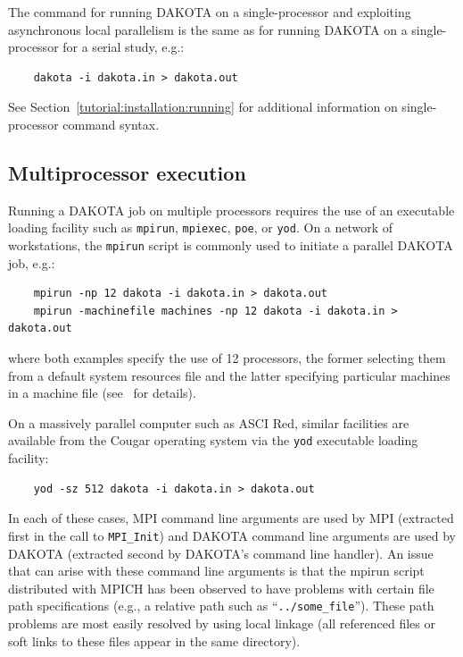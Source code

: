 The command for running DAKOTA on a single-processor and exploiting
asynchronous local parallelism is the same as for running DAKOTA on a
single-processor for a serial study, e.g.:
\begin{small}
\begin{verbatim}
    dakota -i dakota.in > dakota.out
\end{verbatim}
\end{small}

See Section~\ref{tutorial:installation:running} for additional
information on single-processor command syntax.

\subsection{Multiprocessor execution}\label{parallel:running:multiprocessor}

Running a DAKOTA job on multiple processors requires the use of an
executable loading facility such as \texttt{mpirun}, \texttt{mpiexec},
\texttt{poe}, or \texttt{yod}.  On a network of workstations, the
\texttt{mpirun} script is commonly used to initiate a parallel DAKOTA
job, e.g.:
\begin{small}
\begin{verbatim}
    mpirun -np 12 dakota -i dakota.in > dakota.out
    mpirun -machinefile machines -np 12 dakota -i dakota.in > dakota.out
\end{verbatim}
\end{small}
where both examples specify the use of 12 processors, the former
selecting them from a default system resources file and the latter
specifying particular machines in a machine file (see~\cite{Gro96} for
details).

On a massively parallel computer such as ASCI Red, similar facilities
are available from the Cougar operating system via the \texttt{yod}
executable loading facility:
\begin{small}
\begin{verbatim}
    yod -sz 512 dakota -i dakota.in > dakota.out
\end{verbatim}
\end{small}

In each of these cases, MPI command line arguments are used by MPI
(extracted first in the call to \texttt{MPI\_Init}) and DAKOTA command
line arguments are used by DAKOTA (extracted second by DAKOTA's
command line handler). An issue that can arise with these command line
arguments is that the mpirun script distributed with MPICH has been
observed to have problems with certain file path specifications (e.g.,
a relative path such as ``\texttt{../some\_file}''). These path
problems are most easily resolved by using local linkage (all
referenced files or soft links to these files appear in the same
directory).

